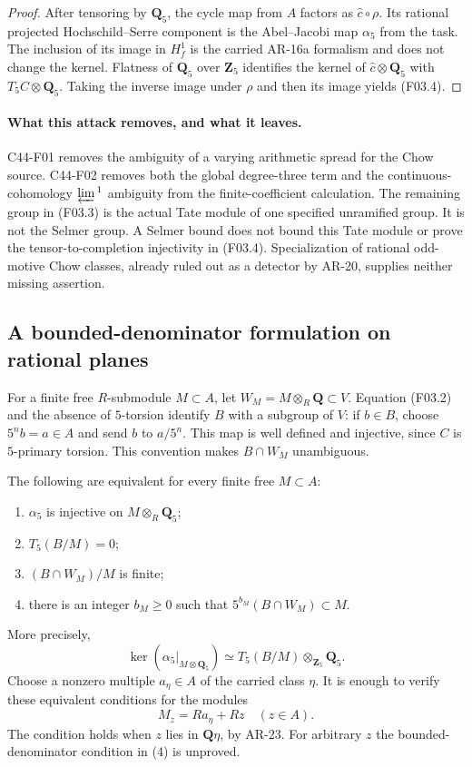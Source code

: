 \begin{proof}
After tensoring by $\mathbf Q_5$, the cycle map from $A$
factors as $\widehat c\circ\rho$.  Its rational projected
Hochschild--Serre component is the Abel--Jacobi map
$\alpha_5$ from the task.  The inclusion of its image in
$H^1_f$ is the carried AR-16a formalism and does not change
the kernel.  Flatness of $\mathbf Q_5$ over $\mathbf Z_5$
identifies the kernel of $\widehat c\otimes\mathbf Q_5$ with
$T_5C\otimes\mathbf Q_5$.  Taking the inverse image under
$\rho$ and then its image yields (F03.4).
\end{proof}

\paragraph{What this attack removes, and what it leaves.}
C44-F01 removes the ambiguity of a varying arithmetic spread for
the Chow source.  C44-F02 removes both the global degree-three
term and the continuous-cohomology $\varprojlim{}^1$ ambiguity
from the finite-coefficient calculation.  The remaining group
in (F03.3) is the actual Tate module of one specified unramified
group.  It is not the Selmer group.  A Selmer bound does not bound
this Tate module or prove the tensor-to-completion injectivity in
(F03.4).  Specialization of rational odd-motive Chow classes,
already ruled out as a detector by AR-20, supplies neither
missing assertion.

\subsection{A bounded-denominator formulation on rational planes}

For a finite free $R$-submodule $M\subset A$, let
$W_M=M\otimes_R\mathbf Q\subset V$.  Equation (F03.2) and
the absence of $5$-torsion identify $B$ with a subgroup of $V$:
if $b\in B$, choose $5^n b=a\in A$ and send $b$ to $a/5^n$.
This map is well defined and injective, since $C$ is $5$-primary
torsion.  This convention makes $B\cap W_M$ unambiguous.

\begin{proposition}[C44-F04]\label{C44-F04}
The following are equivalent for every finite free $M\subset A$:
\begin{enumerate}
\item $\alpha_5$ is injective on $M\otimes_R\mathbf Q_5$;
\item $T_5(B/M)=0$;
\item $(B\cap W_M)/M$ is finite;
\item there is an integer $b_M\ge0$ such that
      $5^{b_M}(B\cap W_M)\subset M$.
\end{enumerate}
More precisely,
\[
 \ker(\alpha_5|_{M\otimes\mathbf Q_5})
       \simeq T_5(B/M)\otimes_{\mathbf Z_5}\mathbf Q_5.
 \tag{F04.1}
\]
Choose a nonzero multiple $a_\eta\in A$ of the carried class
$\eta$.  It is enough to verify these equivalent conditions for
the modules
\[
                  M_z=R a_\eta+Rz\quad(z\in A).
 \tag{F04.2}
\]
The condition holds when $z$ lies in $\mathbf Q\eta$, by AR-23.
For arbitrary $z$ the bounded-denominator condition in (4) is
unproved.
\end{proposition}

